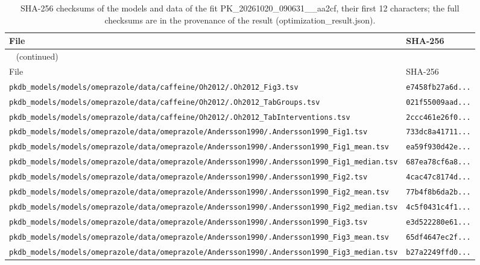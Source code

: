 \begin{longtable}{ll}
\caption{SHA-256 checksums of the models and data of the fit PK\_20261020\_090631\_\_aa2cf, their first 12 characters; the full checksums are in the provenance of the result (optimization\_result.json).}\label{tab:checksums:PK_20261020_090631__aa2cf} \\
\toprule
File & SHA-256 \\
\midrule
\endfirsthead
\multicolumn{2}{l}{\small\tablename~\thetable{} (continued)} \\
\toprule
File & SHA-256 \\
\midrule
\endhead
\bottomrule
\endlastfoot
\texttt{pkdb\_models/models/omeprazole/data/caffeine/Oh2012/.Oh2012\_Fig3.tsv} & \texttt{e7458fb27a6d...} \\
\texttt{pkdb\_models/models/omeprazole/data/caffeine/Oh2012/.Oh2012\_TabGroups.tsv} & \texttt{021f55009aad...} \\
\texttt{pkdb\_models/models/omeprazole/data/caffeine/Oh2012/.Oh2012\_TabInterventions.tsv} & \texttt{2ccc461e26f0...} \\
\texttt{pkdb\_models/models/omeprazole/data/omeprazole/Andersson1990/.Andersson1990\_Fig1.tsv} & \texttt{733dc8a41711...} \\
\texttt{pkdb\_models/models/omeprazole/data/omeprazole/Andersson1990/.Andersson1990\_Fig1\_mean.tsv} & \texttt{ea59f930d42e...} \\
\texttt{pkdb\_models/models/omeprazole/data/omeprazole/Andersson1990/.Andersson1990\_Fig1\_median.tsv} & \texttt{687ea78cf6a8...} \\
\texttt{pkdb\_models/models/omeprazole/data/omeprazole/Andersson1990/.Andersson1990\_Fig2.tsv} & \texttt{4cac47c8174d...} \\
\texttt{pkdb\_models/models/omeprazole/data/omeprazole/Andersson1990/.Andersson1990\_Fig2\_mean.tsv} & \texttt{77b4f8b6da2b...} \\
\texttt{pkdb\_models/models/omeprazole/data/omeprazole/Andersson1990/.Andersson1990\_Fig2\_median.tsv} & \texttt{4c5f0431c4f1...} \\
\texttt{pkdb\_models/models/omeprazole/data/omeprazole/Andersson1990/.Andersson1990\_Fig3.tsv} & \texttt{e3d522280e61...} \\
\texttt{pkdb\_models/models/omeprazole/data/omeprazole/Andersson1990/.Andersson1990\_Fig3\_mean.tsv} & \texttt{65df4647ec2f...} \\
\texttt{pkdb\_models/models/omeprazole/data/omeprazole/Andersson1990/.Andersson1990\_Fig3\_median.tsv} & \texttt{b27a2249ffd0...} \\

\end{longtable}
